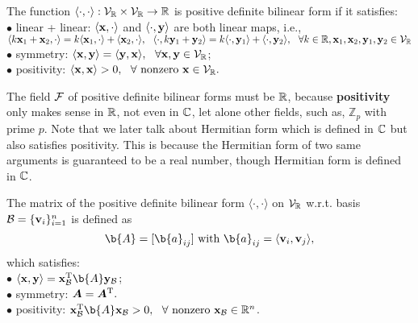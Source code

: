 \begin{definition}\label{def:positive-definite}
The function $\langle \cdot, \cdot \rangle: \mathcal{V}_{\mathbb{R}} \times \mathcal{V}_{\mathbb{R}} \to \mathbb{R}$ is positive definite bilinear form if it satisfies:\\
$\bullet$ linear +  linear: $\langle \mathbf{x}, \cdot \rangle$ and $\langle \cdot, \mathbf{y} \rangle$ are both linear maps, 
i.e., $\langle k\mathbf{x}_1+\mathbf{x}_2, \cdot  \rangle = k \langle \mathbf{x}_1, \cdot \rangle + \langle  \mathbf{x}_2, \cdot \rangle,  ~\ \langle \cdot, k\mathbf{y}_1+\mathbf{y}_2 \rangle = k \langle \cdot, \mathbf{y}_1 \rangle + \langle \cdot, \mathbf{y}_2 \rangle, ~\ \forall k \in \mathbb{R}, \mathbf{x}_1, \mathbf{x}_2, \mathbf{y}_1, \mathbf{y}_2 \in \mathcal{V}_{\mathbb{R}}$ \\
$\bullet$ symmetry: $\langle \mathbf{x}, \mathbf{y} \rangle = \langle \mathbf{y},\mathbf{x} \rangle, ~\ \forall \mathbf{x}, \mathbf{y} \in \mathcal{V}_{\mathbb{R}}$;\\
$\bullet$ positivity: $ \langle \x, \x \rangle > 0, ~\ \forall \textnormal{ nonzero } \x \in \VR.$
\end{definition}

\begin{remark}
The field ${\mathcal{F}}$ of positive definite bilinear forms must be $\mathbb{R}$, because \textbf{positivity} only makes sense in $\mathbb{R}$, not even in $\mathbb{C}$, let alone other fields, such as, $\mathbb{Z}_p$ with prime $p$. 
Note that we later talk about Hermitian form which is defined in $\mathbb{C}$ but also satisfies positivity. 
This is because the Hermitian form of two same arguments is guaranteed to be a real number, though Hermitian form is defined in $\mathbb{C}$.
\end{remark}

\begin{proposition}
The matrix of the positive definite bilinear form $\langle \cdot, \cdot \rangle$ on $\mathcal{V}_{\mathbb{R}}$ w.r.t. basis $\mathcal{B} = \{\mathbf{v}_i\}_{i=1}^n$ is defined as
%
\begin{equation*}
    \b{A} = [\b{a}_{ij}] \textnormal{  with  } \b{a}_{ij} = \langle \vv_i, \vv_j \rangle,
\end{equation*}
%
which satisfies:\\
$\bullet$ $ \langle \x, \y \rangle = \x^\T_{\mathcal{B}} \b{A} \y_{\mathcal{B}}$;\\
$\bullet$ symmetry: $\bm A = \bm A^{\mathrm{T}}.$\\
$\bullet$ positivity: $\x^\T_{\mathcal{B}} \b{A} \x_{\mathcal{B}} > 0, ~\ \forall \textnormal{ nonzero } \x_{\mathcal{B}} \in \R^n$.
\end{proposition}

